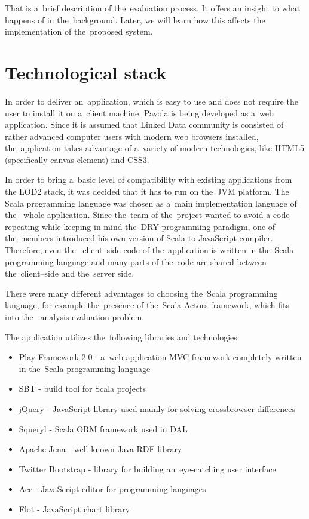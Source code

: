 That is a~brief description of the~evaluation process. It offers an insight
to what happens of in the~background. Later, we will learn how this affects 
the implementation of the~proposed system.

\section{Technological stack}
In order to deliver an~application, which is easy to use and does not require 
the user to install it on a~client machine, Payola is being developed as a~web
application. Since it is assumed that Linked Data community is consisted of
rather advanced computer users with modern web browsers installed, the~application 
takes advantage of a~variety of modern technologies, like HTML5 (specifically
canvas element) and CSS3.

In order to bring a~basic level of compatibility with existing applications from 
the LOD2 stack, it was decided that it has to run on the~JVM platform. The 
Scala programming language was chosen as a~main implementation language of the~
whole application. Since the~team of the~project wanted to avoid a code repeating 
while keeping in mind the~DRY programming paradigm, one of the~members 
introduced his own version of Scala to JavaScript compiler. Therefore, even the~
client--side code of the~application is written in the~Scala programming language 
and many parts of the~code are shared between the~client--side and the~server 
side.

There were many different advantages to choosing the~Scala programming language, 
for example the~presence of the~Scala Actors framework, which fits into the~
analysis evaluation problem.

The application utilizes the~following libraries and technologies:
\begin{itemize}
  \item Play Framework 2.0 - a~web application MVC framework completely written 
  in the~Scala programming language
  \item SBT - build tool for Scala projects
  \item jQuery - JavaScript library used mainly for solving crossbrowser 
  differences
  \item Squeryl - Scala ORM framework used in DAL
  \item Apache Jena - well known Java RDF library
  \item Twitter Bootstrap - library for building an~eye-catching user interface
  \item Ace - JavaScript editor for programming languages
  \item Flot - JavaScript chart library
\end{itemize}

